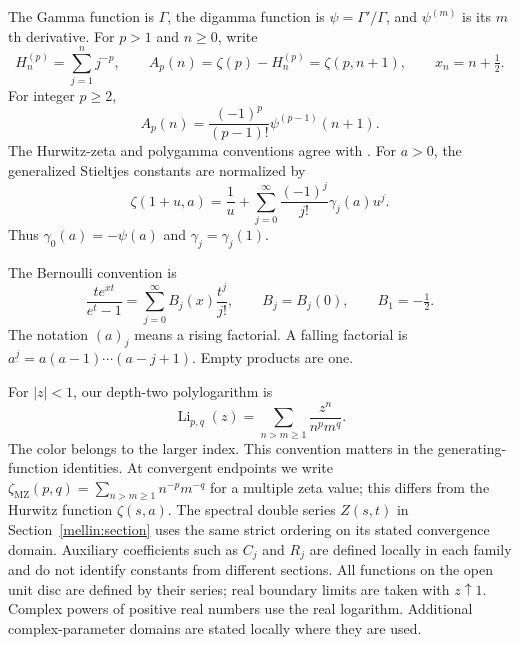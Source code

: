 \documentclass[11pt,letterpaper]{article}
\theoremstyle{definition}
\theoremstyle{remark}
\DeclareMathOperator{\Li}{Li}
\numberwithin{equation}{section}
\begin{document}
The Gamma function is $\Gamma$, the digamma function is
$\psi=\Gamma'/\Gamma$, and $\psi^{(m)}$ is its $m$th derivative.
For $p>1$ and $n\geq0$, write
\begin{equation}\label{eq:tails}
 H_n^{(p)}=\sum_{j=1}^n j^{-p},\qquad
 A_p(n)=\zeta(p)-H_n^{(p)}=\zeta(p,n+1),\qquad
 x_n=n+\tfrac12.
\end{equation}
For integer $p\geq2$,
\begin{equation}\label{eq:tail-polygamma}
 A_p(n)=\frac{(-1)^p}{(p-1)!}\psi^{(p-1)}(n+1).
\end{equation}
The Hurwitz-zeta and polygamma conventions agree with
\cite{dlmf-hurwitz,dlmf-polygamma}.
For $a>0$, the generalized Stieltjes constants are normalized by
\begin{equation}\label{eq:stieltjes-convention}
 \zeta(1+u,a)=\frac1u+
   \sum_{j=0}^{\infty}\frac{(-1)^j}{j!}\gamma_j(a)u^j.
\end{equation}
Thus $\gamma_0(a)=-\psi(a)$ and $\gamma_j=\gamma_j(1)$.

The Bernoulli convention is
\begin{equation}\label{eq:bernoulli-convention}
 \frac{te^{xt}}{e^t-1}=\sum_{j=0}^{\infty}B_j(x)\frac{t^j}{j!},
 \qquad B_j=B_j(0),\qquad B_1=-\tfrac12.
\end{equation}
The notation $(a)_j$ means a rising factorial. A falling factorial is
$a^{\underline j}=a(a-1)\cdots(a-j+1)$. Empty products are one.

For $|z|<1$, our depth-two polylogarithm is
\begin{equation}\label{eq:depth-two-convention}
 \Li_{p,q}(z)=\sum_{n>m\geq1}\frac{z^n}{n^p m^q}.
\end{equation}
The color belongs to the larger index. This convention matters in the
generating-function identities. At convergent endpoints we write
$\zeta_{\mathrm{MZ}}(p,q)=\sum_{n>m\geq1}n^{-p}m^{-q}$ for a
multiple zeta value; this differs from the Hurwitz function $\zeta(s,a)$.
The spectral double series $Z(s,t)$ in Section~\ref{mellin:section}
uses the same strict ordering on its stated convergence domain.
Auxiliary coefficients such as $C_j$ and $R_j$ are defined locally in
each family and do not identify constants from different sections.
All functions on the open unit disc are
defined by their series; real boundary limits are taken with $z\uparrow1$.
Complex powers of positive real numbers use the real logarithm. Additional
complex-parameter domains are stated locally where they are used.

\end{document}
